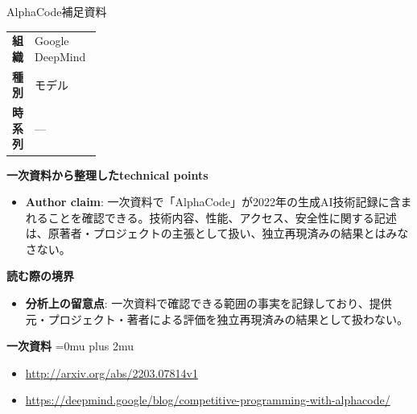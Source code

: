 \begin{technicalnote}{AlphaCode}{補足資料}
\begingroup
\begin{tabularx}{\linewidth}{@{}>{\bfseries}p{0.22\linewidth}X@{}}
組織 & Google DeepMind \\
種別 & モデル \\
時系列 & — \\
\end{tabularx}
\smallskip
{\bfseries 一次資料から整理したtechnical points}
\begin{itemize}[leftmargin=1.5em,itemsep=0.35em]
\item \textbf{Author claim}: 一次資料で「AlphaCode」が2022年の生成AI技術記録に含まれることを確認できる。技術内容、性能、アクセス、安全性に関する記述は、原著者・プロジェクトの主張として扱い、独立再現済みの結果とはみなさない。
\end{itemize}
\begin{minipage}{\linewidth}
{\bfseries 読む際の境界}
\begin{itemize}[leftmargin=1.5em,itemsep=0.35em]
\item \textbf{分析上の留意点}: 一次資料で確認できる範囲の事実を記録しており、提供元・プロジェクト・著者による評価を独立再現済みの結果として扱わない。
\end{itemize}
\begin{samepage}
{\bfseries 一次資料}
\begingroup\sloppy
\Urlmuskip=0mu plus 2mu\relax
\begin{itemize}[leftmargin=1.5em,itemsep=0.25em]
\item {\scriptsize\url{http://arxiv.org/abs/2203.07814v1}}
\item {\scriptsize\url{https://deepmind.google/blog/competitive-programming-with-alphacode/}}
\end{itemize}
\endgroup
\end{samepage}
\end{minipage}
\endgroup
\end{technicalnote}
\medskip

